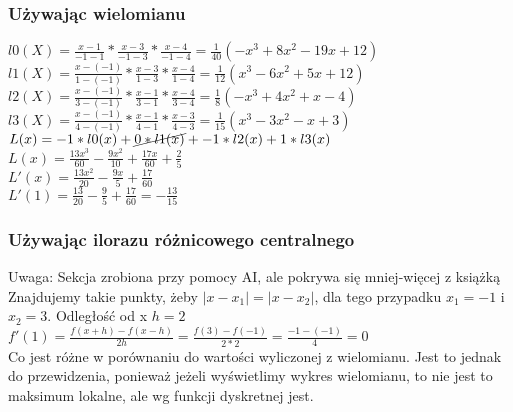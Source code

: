 \documentclass{article}
\begin{document}
\subsubsection{Używając wielomianu}
$l0(X)=\frac{x-1}{-1-1}*\frac{x-3}{-1-3}*\frac{x-4}{-1-4} = \frac{1}{40}(-x^3+8x^2-19x+12)$\\
$l1(X)=\frac{x- (-1)}{1- (-1)}*\frac{x-3}{1-3}*\frac{x-4}{1-4} = \frac{1}{12}(x^3-6x^2+5x+12)$\\
$l2(X)=\frac{x- (-1)}{3- (-1)}*\frac{x-1}{3-1}*\frac{x-4}{3-4} = \frac{1}{8}(-x^3+4x^2+x-4)$\\
$l3(X)=\frac{x- (-1)}{4- (-1)}*\frac{x-1}{4-1}*\frac{x-3}{4-3} = \frac{1}{15}(x^3-3x^2-x+3)$\\
$L(x)=-1*l0(x)+\cancel{0*l1(x)}+-1*l2(x)+1*l3(x)$\\
$L(x)=\frac{13x^3}{60}-\frac{9x^2}{10}+\frac{17x}{60}+\frac{2}{5}$\\
$L'(x)=\frac{13x^2}{20}-\frac{9x}{5}+\frac{17}{60}$\\
$L'(1)=\frac{13}{20}-\frac{9}{5}+\frac{17}{60}=-\frac{13}{15}$
\subsubsection{Używając ilorazu różnicowego centralnego}
Uwaga: Sekcja zrobiona przy pomocy AI, ale pokrywa się mniej-więcej z książką\\
Znajdujemy takie punkty, żeby $|x-x_1|=|x-x_2|$, dla tego przypadku $x_1 = -1$ i $x_2 = 3$. Odległość od x $h=2$\\
$f'(1)=\frac{f(x+h)-f(x-h)}{2h}=\frac{f(3)-f(-1)}{2*2}=\frac{-1-(-1)}{4}=0$\\
Co jest różne w porównaniu do wartości wyliczonej z wielomianu. Jest to jednak do przewidzenia, ponieważ jeżeli wyświetlimy wykres wielomianu, to nie jest to maksimum lokalne, ale wg funkcji dyskretnej jest.
\end{document}

